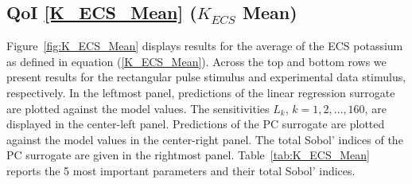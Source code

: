 

\subsection{QoI \eqref{K_ECS_Mean} ($K_{ECS}$ Mean)}
\label{sec:qoi_K_ECS_Mean}

Figure~\ref{fig:K_ECS_Mean} displays results for the average of the ECS potassium as defined in equation (\ref{K_ECS_Mean}). Across the top and bottom rows we present results for the rectangular pulse stimulus and experimental data stimulus, respectively. In the leftmost panel, predictions of the linear regression surrogate are plotted against the model values. The sensitivities $L_k$, $k=1,2,\dots,160$, are displayed in the center-left panel. Predictions of the PC surrogate are plotted against the model values in the center-right panel. The total Sobol' indices of the PC surrogate are given in the rightmost panel. Table~\ref{tab:K_ECS_Mean} reports the 5 most important parameters and their total Sobol' indices. 

